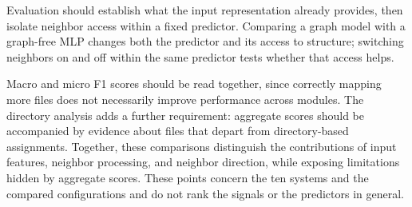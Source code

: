 Evaluation should establish what the input representation already provides, then isolate neighbor access within a fixed predictor. Comparing a graph model with a graph-free MLP changes both the predictor and its access to structure; switching neighbors on and off within the same predictor tests whether that access helps.

Macro and micro F1 scores should be read together, since correctly mapping more files does not necessarily improve performance across modules. The directory analysis adds a further requirement: aggregate scores should be accompanied by evidence about files that depart from directory-based assignments. Together, these comparisons distinguish the contributions of input features, neighbor processing, and neighbor direction, while exposing limitations hidden by aggregate scores. These points concern the ten systems and the compared configurations and do not rank the signals or the predictors in general.